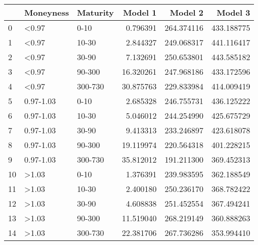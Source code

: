 \begin{tabular}{lllrrr}
\toprule
{} &  Moneyness & Maturity &    Model 1 &     Model 2 &     Model 3 \\
\midrule
0  &      <0.97 &     0-10 &   0.796391 &  264.374116 &  433.188775 \\
1  &      <0.97 &    10-30 &   2.844327 &  249.068317 &  441.116417 \\
2  &      <0.97 &    30-90 &   7.132691 &  250.653801 &  443.585182 \\
3  &      <0.97 &   90-300 &  16.320261 &  247.968186 &  433.172596 \\
4  &      <0.97 &  300-730 &  30.875763 &  229.833984 &  414.009419 \\
5  &  0.97-1.03 &     0-10 &   2.685328 &  246.755731 &  436.125222 \\
6  &  0.97-1.03 &    10-30 &   5.046012 &  244.254990 &  425.675729 \\
7  &  0.97-1.03 &    30-90 &   9.413313 &  233.246897 &  423.618078 \\
8  &  0.97-1.03 &   90-300 &  19.119974 &  220.564318 &  401.228215 \\
9  &  0.97-1.03 &  300-730 &  35.812012 &  191.211300 &  369.452313 \\
10 &      >1.03 &     0-10 &   1.376391 &  239.983595 &  362.188549 \\
11 &      >1.03 &    10-30 &   2.400180 &  250.236170 &  368.782422 \\
12 &      >1.03 &    30-90 &   4.608838 &  251.452554 &  367.494241 \\
13 &      >1.03 &   90-300 &  11.519040 &  268.219149 &  360.888263 \\
14 &      >1.03 &  300-730 &  22.381706 &  267.736286 &  353.994410 \\
\bottomrule
\end{tabular}
